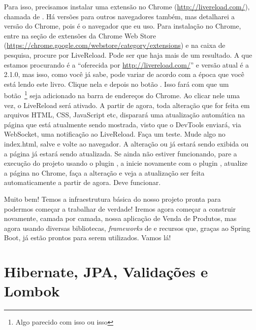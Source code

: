 Para isso, precisamos instalar uma extensão no Chrome (\url{http://livereload.com/}), chamada de . Há versões para outros navegadores também, mas detalharei a versão do Chrome, pois é o navegador que eu uso. Para instalação no Chrome, entre na seção de extensões da Chrome Web Store (\url{https://chrome.google.com/webstore/category/extensions}) e na caixa de pesquisa, procure por LiveReload. Pode ser que haja mais de um resultado. A que estamos procurando é a ``oferecida por \url{http://livereload.com/}'' e versão atual é a 2.1.0, mas isso, como você já sabe, pode variar de acordo com a época que você está lendo este livro. Clique nela e depois no botão . Isso fará com que um botão~\footnote{Algo parecido com isso  ou isso } seja adicionado na barra de endereços do Chrome. Ao clicar nele uma vez, o LiveReload será ativado. A partir de agora, toda alteração que for feita em arquivos HTML, CSS, JavaScript etc, disparará uma atualização automática na página que está atualmente sendo mostrada, visto que o DevTools enviará, via WebSocket, uma notificação ao LiveReload. Faça um teste. Mude algo no index.html, salve e volte ao navegador. A alteração ou já estará sendo exibida ou a página já estará sendo atualizada. Se ainda não estiver funcionando, pare a execução do projeto usando o plugin , a inicie novamente com o plugin , atualize a página no Chrome, faça a alteração e veja a atualização ser feita automaticamente a partir de agora. Deve funcionar.

Muito bem! Temos a infraestrutura básica do nosso projeto pronta para podermos começar a trabalhar de verdade! Iremos agora começar a construir novamente, camada por camada, nossa aplicação de Venda de Produtos, mas agora usando diversas bibliotecas, \textit{frameworks} de e recursos que, graças ao Spring Boot, já estão prontos para serem utilizados. Vamos lá!


\section{Hibernate, JPA, Validações e Lombok}


